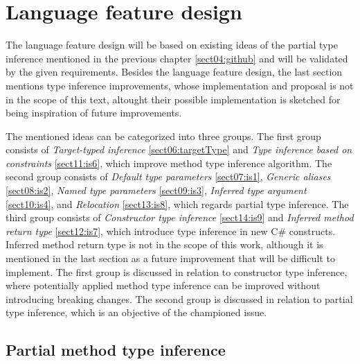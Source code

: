 \chapter{Language feature design} \label{sect09:lang}

The language feature design will be based on existing ideas of the partial type inference mentioned in the previous chapter \ref{sect04:github} and will be validated by the given requirements.
Besides the language feature design, the last section mentions type inference improvements, whose implementation and proposal is not in the scope of this text, altought their possible implementation is sketched for being inspiration of future improvements.
\par
The mentioned ideas can be categorized into three groups. 
The first group consists of \textit{Target-typed inference} \ref{sect06:targetType} and \textit{Type inference based on constraints} \ref{sect11:is6}, which improve method type inference algorithm. 
The second group consists of \textit{Default type parameters} \ref{sect07:is1}, \textit{Generic aliases} \ref{sect08:is2}, \textit{Named type parameters} \ref{sect09:is3}, \textit{Inferred type argument} \ref{sect10:is4}, and \textit{Relocation} \ref{sect13:is8}, which regards partial type inference. 
The third group consists of \textit{Constructor type inference} \ref{sect14:is9} and \textit{Inferred method return type} \ref{sect12:is7}, which introduce type inference in new C\# constructs. 
Inferred method return type is not in the scope of this work, although it is mentioned in the last section as a future improvement that will be difficult to implement. 
The first group is discussed in relation to constructor type inference, where potentially applied method type inference can be improved without introducing breaking changes. 
The second group is discussed in relation to partial type inference, which is an objective of the championed issue.

\section{Partial method type inference}

